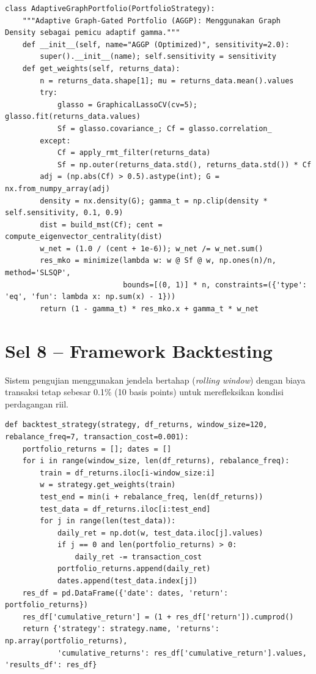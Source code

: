 \documentclass[12pt,a4paper]{article}
\begin{document}
\begin{lstlisting}[caption={Kelas-kelas strategi portofolio}]
class AdaptiveGraphPortfolio(PortfolioStrategy):
    """Adaptive Graph-Gated Portfolio (AGGP): Menggunakan Graph Density sebagai pemicu adaptif gamma."""
    def __init__(self, name="AGGP (Optimized)", sensitivity=2.0):
        super().__init__(name); self.sensitivity = sensitivity
    def get_weights(self, returns_data):
        n = returns_data.shape[1]; mu = returns_data.mean().values
        try:
            glasso = GraphicalLassoCV(cv=5); glasso.fit(returns_data.values)
            Sf = glasso.covariance_; Cf = glasso.correlation_
        except:
            Cf = apply_rmt_filter(returns_data)
            Sf = np.outer(returns_data.std(), returns_data.std()) * Cf
        adj = (np.abs(Cf) > 0.5).astype(int); G = nx.from_numpy_array(adj)
        density = nx.density(G); gamma_t = np.clip(density * self.sensitivity, 0.1, 0.9)
        dist = build_mst(Cf); cent = compute_eigenvector_centrality(dist)
        w_net = (1.0 / (cent + 1e-6)); w_net /= w_net.sum()
        res_mko = minimize(lambda w: w @ Sf @ w, np.ones(n)/n, method='SLSQP', 
                           bounds=[(0, 1)] * n, constraints=({'type': 'eq', 'fun': lambda x: np.sum(x) - 1}))
        return (1 - gamma_t) * res_mko.x + gamma_t * w_net
\end{lstlisting}

\section{Sel 8 -- Framework Backtesting}
Sistem pengujian menggunakan jendela bertahap (\textit{rolling window}) dengan biaya transaksi tetap sebesar 0.1\% (10 basis points) untuk merefleksikan kondisi perdagangan riil.

\begin{lstlisting}[caption={Fungsi simulasi backtest}]
def backtest_strategy(strategy, df_returns, window_size=120, rebalance_freq=7, transaction_cost=0.001):
    portfolio_returns = []; dates = []
    for i in range(window_size, len(df_returns), rebalance_freq):
        train = df_returns.iloc[i-window_size:i]
        w = strategy.get_weights(train)
        test_end = min(i + rebalance_freq, len(df_returns))
        test_data = df_returns.iloc[i:test_end]
        for j in range(len(test_data)):
            daily_ret = np.dot(w, test_data.iloc[j].values)
            if j == 0 and len(portfolio_returns) > 0:
                daily_ret -= transaction_cost
            portfolio_returns.append(daily_ret)
            dates.append(test_data.index[j])
    res_df = pd.DataFrame({'date': dates, 'return': portfolio_returns})
    res_df['cumulative_return'] = (1 + res_df['return']).cumprod()
    return {'strategy': strategy.name, 'returns': np.array(portfolio_returns),
            'cumulative_returns': res_df['cumulative_return'].values, 'results_df': res_df}
\end{lstlisting}
\end{document}
